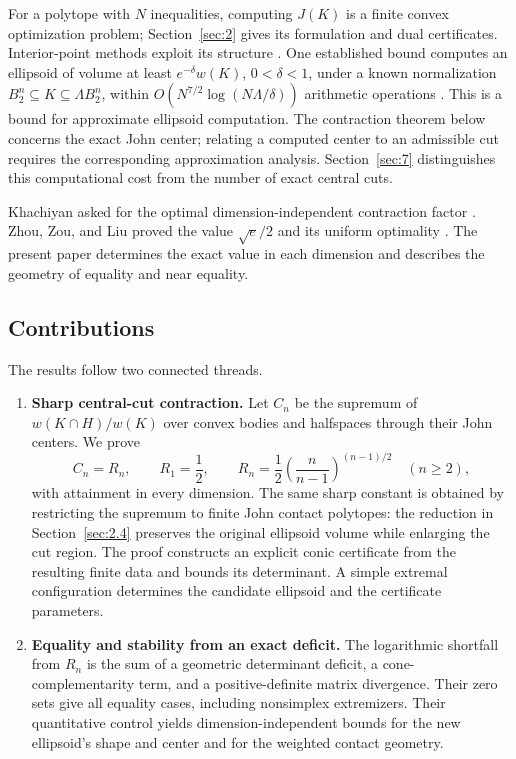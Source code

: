 For a polytope with $N$ inequalities, computing $J(K)$ is a finite convex optimization problem; Section~\ref{sec:2} gives its formulation and dual certificates. Interior-point methods exploit its structure \cite{NN1994,KT1993,ZG2003}. One established bound computes an ellipsoid of volume at least $e^{-\delta}w(K)$, $0<\delta<1$, under a known normalization $B_2^n\subseteq K\subseteq\Lambda B_2^n$, within $O(N^{7/2}\log(N\Lambda/\delta))$ arithmetic operations \cite{Anstreicher2002}. This is a bound for approximate ellipsoid computation. The contraction theorem below concerns the exact John center; relating a computed center to an admissible cut requires the corresponding approximation analysis. Section~\ref{sec:7} distinguishes this computational cost from the number of exact central cuts.

Khachiyan asked for the optimal dimension-independent contraction factor \cite{Khachiyan1990}. Zhou, Zou, and Liu proved the value $\sqrt e/2$ and its uniform optimality \cite{Zhou2026}. The present paper determines the exact value in each dimension and describes the geometry of equality and near equality.

\subsection{Contributions}\label{sec:1.2}

The results follow two connected threads.

\begin{enumerate}[label=\arabic*.,leftmargin=*]

\item \textbf{Sharp central-cut contraction.} Let $C_n$ be the supremum of $w(K\cap H)/w(K)$ over convex bodies and halfspaces through their John centers. We prove
\begin{equation}\label{eq:1.3}
C_n=R_n,\qquad R_1=\frac12,\qquad
R_n=\frac12\left(\frac n{n-1}\right)^{(n-1)/2}\quad(n\ge2),
\end{equation}
with attainment in every dimension. The same sharp constant is obtained by restricting the supremum to finite John contact polytopes: the reduction in Section~\ref{sec:2.4} preserves the original ellipsoid volume while enlarging the cut region. The proof constructs an explicit conic certificate from the resulting finite data and bounds its determinant. A simple extremal configuration determines the candidate ellipsoid and the certificate parameters.

\item \textbf{Equality and stability from an exact deficit.} The logarithmic shortfall from $R_n$ is the sum of a geometric determinant deficit, a cone-complementarity term, and a positive-definite matrix divergence. Their zero sets give all equality cases, including nonsimplex extremizers. Their quantitative control yields dimension-independent bounds for the new ellipsoid's shape and center and for the weighted contact geometry.

\end{enumerate}

